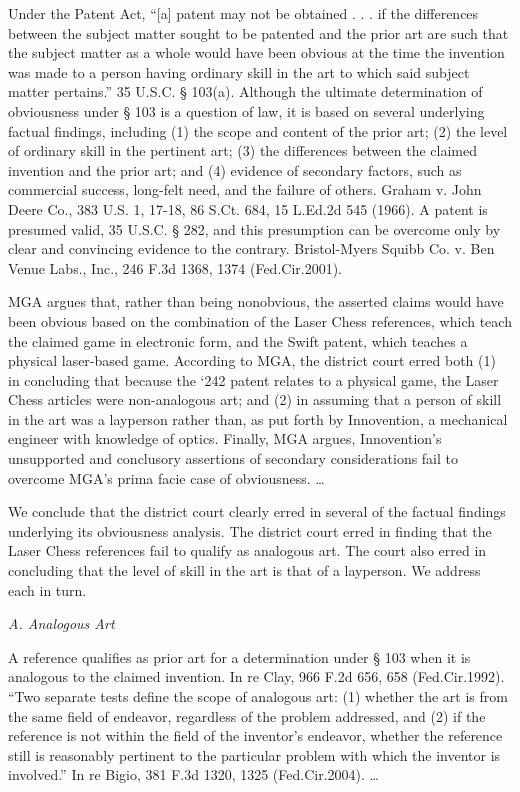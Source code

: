 Under the Patent Act, ``[a] patent may not be obtained . . . if the differences
between the subject matter sought to be patented and the prior art are such
that the subject matter as a whole would have been obvious at the time the
invention was made to a person having ordinary skill in the art to which said
subject matter pertains.'' 35 U.S.C. {\S} 103(a). Although the ultimate
determination of obviousness under {\S} 103 is a question of law, it is based
on several underlying factual findings, including (1) the scope and content of
the prior art; (2) the level of ordinary skill in the pertinent art; (3) the
differences between the claimed invention and the prior art; and (4) evidence
of secondary factors, such as commercial success, long-felt need, and the
failure of others. Graham v. John Deere Co., 383 U.S. 1, 17-18, 86 S.Ct. 684,
15 L.Ed.2d 545 (1966). A patent is presumed valid, 35 U.S.C. {\S} 282, and this
presumption can be overcome only by clear and convincing evidence to the
contrary. Bristol-Myers Squibb Co. v. Ben Venue Labs., Inc., 246 F.3d 1368,
1374 (Fed.Cir.2001).

MGA argues that, rather than being nonobvious, the asserted claims would have
been obvious based on the combination of the Laser Chess references, which
teach the claimed game in electronic form, and the Swift patent, which teaches
a physical laser-based game. According to MGA, the district court erred both
(1) in concluding that because the `242 patent relates to a physical game, the
Laser Chess articles were non-analogous art; and (2) in assuming that a person
of skill in the art was a layperson rather than, as put forth by Innovention, a
mechanical engineer with knowledge of optics. Finally, MGA argues,
Innovention's unsupported and conclusory assertions of secondary considerations
fail to overcome MGA's prima facie case of obviousness. {\dots}

We conclude that the district court clearly erred in several of the factual
findings underlying its obviousness analysis. The district court erred in
finding that the Laser Chess references fail to qualify as analogous art. The
court also erred in concluding that the level of skill in the art is that of a
layperson. We address each in turn.

{\centering
\textit{A. Analogous Art}
\par}

A reference qualifies as prior art for a determination under {\S} 103 when it is
analogous to the claimed invention. In re Clay, 966 F.2d 656, 658
(Fed.Cir.1992). ``Two separate tests define the scope of analogous art: (1)
whether the art is from the same field of endeavor, regardless of the problem
addressed, and (2) if the reference is not within the field of the inventor's
endeavor, whether the reference still is reasonably pertinent to the particular
problem with which the inventor is involved.'' In re Bigio, 381 F.3d 1320, 1325
(Fed.Cir.2004). {\dots}

